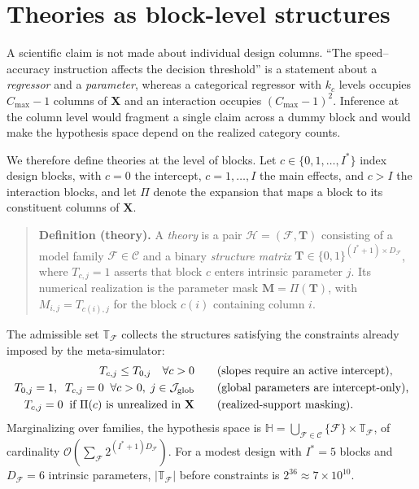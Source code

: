 \documentclass[11pt]{article}
\newcommand{\rmX}{\mathbf{X}}
\newcommand{\rmM}{\mathbf{M}}
\newcommand{\rmT}{\mathbf{T}}
\begin{document}
\section{Theories as block-level structures}

A scientific claim is not made about individual design columns. ``The speed--accuracy
instruction affects the decision threshold'' is a statement about a \emph{regressor} and
a \emph{parameter}, whereas a categorical regressor with $k_c$ levels occupies
$C_{\max}-1$ columns of $\rmX$ and an interaction occupies $(C_{\max}-1)^2$. Inference
at the column level would fragment a single claim across a dummy block and would make
the hypothesis space depend on the realized category counts.

We therefore define theories at the level of blocks. Let $c \in \{0,1,\dots,I^\ast\}$
index design blocks, with $c=0$ the intercept, $c = 1,\dots,I$ the main effects, and
$c > I$ the interaction blocks, and let $\Pi$ denote the expansion that maps a block to
its constituent columns of $\rmX$.

\begin{quote}
\textbf{Definition (theory).} A \emph{theory} is a pair
$\mathcal{H} = (\mathcal{F}, \rmT)$ consisting of a model family $\mathcal{F} \in \mathcal{C}$
and a binary \emph{structure matrix}
$\rmT \in \{0,1\}^{(I^\ast+1) \times D_\mathcal{F}}$, where $T_{c,j} = 1$ asserts that
block $c$ enters intrinsic parameter $j$. Its numerical realization is the parameter
mask $\rmM = \Pi(\rmT)$, with $M_{i,j} = T_{c(i),j}$ for the block $c(i)$ containing
column $i$.
\end{quote}

The admissible set $\mathbb{T}_\mathcal{F}$ collects the structures satisfying the
constraints already imposed by the meta-simulator:
%
\begin{align}
\label{eq:td-constraints}
T_{c,j} \le T_{0,j} \quad \forall c > 0
&\qquad \text{(slopes require an active intercept),}\\
T_{0,j} = 1,\;\; T_{c,j} = 0 \;\; \forall c>0, \; j \in \mathcal{J}_{\mathrm{glob}}
&\qquad \text{(global parameters are intercept-only),}\notag\\
T_{c,j} = 0 \;\;\text{if } \Pi(c) \text{ is unrealized in } \rmX
&\qquad \text{(realized-support masking).}\notag
\end{align}
%
Marginalizing over families, the hypothesis space is
$\mathbb{H} = \bigcup_{\mathcal{F} \in \mathcal{C}} \{\mathcal{F}\} \times \mathbb{T}_\mathcal{F}$,
of cardinality $\mathcal{O}\!\left(\sum_\mathcal{F} 2^{(I^\ast+1)D_\mathcal{F}}\right)$.
For a modest design with $I^\ast = 5$ blocks and $D_\mathcal{F} = 6$ intrinsic parameters,
$|\mathbb{T}_\mathcal{F}|$ before constraints is $2^{36} \approx 7\times10^{10}$.
\end{document}
